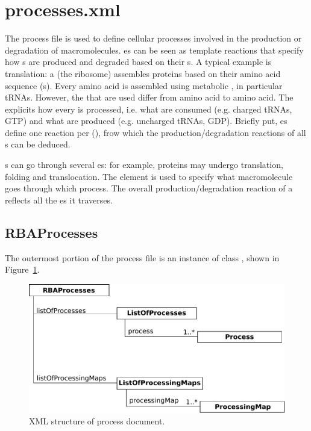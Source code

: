 
\section{processes.xml}

The process file is used to define cellular processes involved in
the production or degradation of macromolecules.
\process{}es can be seen as template reactions that specify how \macromolecule{}s
are produced and degraded based on their \component{}s.
A typical example is translation: a \machinery{} (the ribosome) assembles
proteins based on their amino acid sequence (\component{}s).
Every amino acid is assembled using metabolic \species, in particular tRNAs.
However, the \species{} that are used differ from amino acid to amino acid.
The \processingmap{} explicits how every \component{} is processed, i.e.
what \species{} are consumed (e.g. charged tRNAs, GTP) and what \species{} are
produced (e.g. uncharged tRNAs, GDP).
Briefly put, \process{}es define one reaction per \component(), frow which
the production/degradation reactions of all \macromolecule{}s can be deduced.

\macromolecule{}s can go through several \process{}es:
for example, proteins may undergo translation, folding and translocation.
The \processings{} element is used to specify what macromolecule goes
through which process.
The overall production/degradation reaction of a \macromolecule{} reflects
all the \process{}es it traverses.

\subsection{RBAProcesses}
\label{sec:rba_processes}

The outermost portion of the process file is an instance of class
\rbaprocesses, shown in Figure~\ref{fig:processes_doc}.

\begin{figure}
  \centering
  \includegraphics[scale=0.8]{figures/processes_doc}
  \caption{XML structure of process document.}
\label{fig:processes_doc}
\end{figure}

